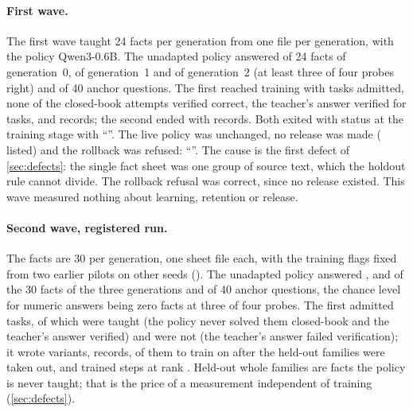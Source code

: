 \paragraph{First wave.} The first wave taught 24 facts per generation from one file per
generation, with the policy Qwen3-0.6B. The unadapted policy answered \mETwoBaseGZero{} of 24 facts
of generation~0, \mETwoBaseGOne{} of generation~1 and \mETwoBaseGTwo{} of generation~2 (at least
three of four probes right) and \mETwoBaseAnchor{} of 40 anchor questions.
The first  reached training with \mETwoGZeroTasks{} tasks admitted, none of the
\mETwoGZeroAttempts{} closed-book attempts verified correct, the teacher's answer verified for
\mETwoGZeroTeacherVerified{} tasks, and \mETwoGZeroDatasetRecords{} records; the second ended with
\mETwoGOneDatasetRecords{} records. Both exited with status \mETwoExitLearnGZero{} at the
training stage with ``\mETwoGZeroRefusal''. The live policy was unchanged, no release was made
(\mETwoReleasesFinal{} listed) and the rollback was refused: ``\mETwoRollbackMessage''.
The cause is the first defect of \cref{sec:defects}: the single fact sheet was one group of source
text, which the holdout rule cannot divide. The rollback refusal was correct, since no release
existed. This wave measured nothing about learning, retention or release.

\paragraph{Second wave, registered run.} The facts are 30 per generation, one sheet file each,
with the training flags fixed from two earlier pilots on other seeds ().
The unadapted policy answered \mETworBaseGZero{}, \mETworBaseGOne{} and \mETworBaseGTwo{} of the
30 facts of the three generations and \mETworBaseAnchor{} of 40 anchor questions, the chance level for
numeric answers being zero facts at three of four probes.
The first  admitted \mETworGZeroTasks{} tasks, of which \mETworGZeroTaught{} were taught
(the policy never solved them closed-book and the teacher's answer verified) and \mETworGZeroNever{}
were not (the teacher's answer failed verification); it wrote \mETworGZeroVariants{} variants,
\mETworGZeroRecords{} records, \mETworGZeroTrainRecords{} of them to train on after the held-out
families were taken out, and trained \mETworGZeroSteps{} steps at rank \mETworGZeroRank.
Held-out whole families are facts the policy is never taught; that is the price of a
measurement independent of training (\cref{sec:defects}).


